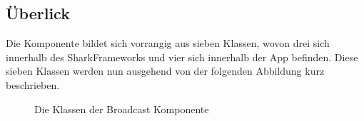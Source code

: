 \subsection{Überlick}\label{ch:broadcastoverview}
Die Komponente bildet sich vorrangig aus sieben Klassen, wovon drei sich innerhalb des SharkFrameworks und vier sich innerhalb der App befinden. Diese sieben Klassen werden nun ausgehend von der folgenden Abbildung kurz beschrieben.
\begin{figure}[H]
	\centering
	\hspace*{1cm}
	\caption{Die Klassen der Broadcast Komponente}
	\label{fig:broadcastStructure}
\end{figure}
